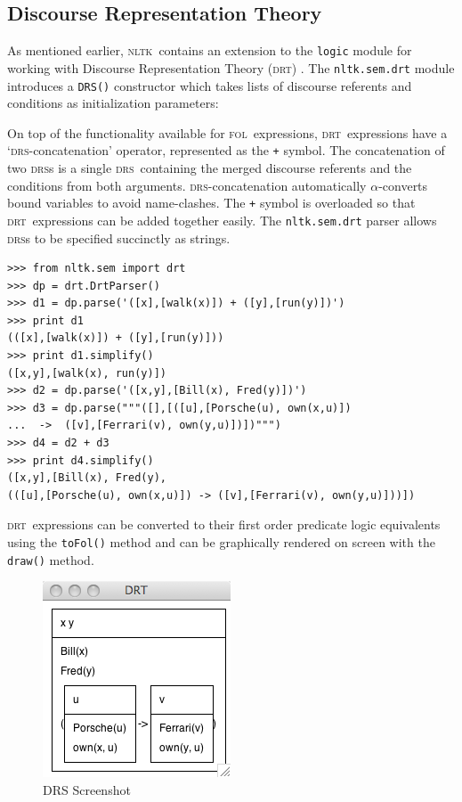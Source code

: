\documentclass[11pt, a4paper]{article}
\newcommand{\DRS}{\textsc{drs}}
\newcommand{\DRT}{\textsc{drt}}
\newcommand{\FOL}{\textsc{fol}}
\newcommand{\NLTK}{\textsc{nltk}}
\begin{document}
\subsection{Discourse Representation Theory}
As mentioned earlier, \NLTK\ contains an extension to the
\texttt{logic} module for working with Discourse Representation Theory
(\DRT) \citep{KampReyle}.  The \texttt{nltk.sem.drt} module introduces
a \texttt{DRS()} constructor which takes lists of discourse referents
and conditions as initialization parameters:
\vspace{-2ex}

On top of the functionality available for \FOL\
expressions, \DRT\ expressions have a `\DRS-concatenation' operator,
represented as the \texttt{+} symbol.  The concatenation of two \DRS s
is a single \DRS\ containing the merged discourse referents and the
conditions from both arguments.  \DRS-concatenation automatically
$\alpha$-converts bound variables to avoid name-clashes.  The
\texttt{+} symbol is overloaded so that \DRT\ expressions can be added
together easily.  The \texttt{nltk.sem.drt} parser allows \DRS s to be
specified succinctly as strings.
\begin{Verbatim}
>>> from nltk.sem import drt
>>> dp = drt.DrtParser()
>>> d1 = dp.parse('([x],[walk(x)]) + ([y],[run(y)])')
>>> print d1
(([x],[walk(x)]) + ([y],[run(y)]))
>>> print d1.simplify()
([x,y],[walk(x), run(y)])
>>> d2 = dp.parse('([x,y],[Bill(x), Fred(y)])')
>>> d3 = dp.parse("""([],[([u],[Porsche(u), own(x,u)])
...  ->  ([v],[Ferrari(v), own(y,u)])])""")
>>> d4 = d2 + d3
>>> print d4.simplify()
([x,y],[Bill(x), Fred(y),
(([u],[Porsche(u), own(x,u)]) -> ([v],[Ferrari(v), own(y,u)]))])
\end{Verbatim}

\noindent
\DRT\ expressions can be converted to their first order predicate
logic equivalents using the \texttt{toFol()} method and can be
graphically rendered on screen with the \texttt{draw()} method.

\begin{figure}
\vspace{-16ex}
\begin{center}
   \includegraphics[scale=.5]{drs.png}
 \end{center}
\vspace{-4ex}
\caption{\small DRS Screenshot} 
\vspace{-10ex}
\end{figure}
\end{document}
